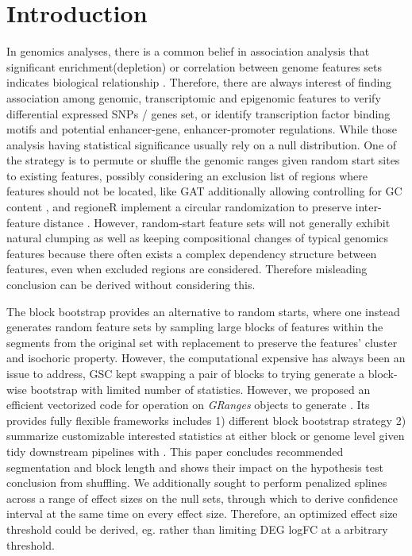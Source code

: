 \section{Introduction}
In genomics analyses, there is a common belief in association 
analysis that significant enrichment(depletion) or correlation between genome features sets indicates biological relationship \citep{reviewdilemma2014}. 
Therefore, there are always interest of finding association among genomic, transcriptomic and epigenomic features
to verify differential expressed SNPs / genes set, or identify transcription factor binding motifs and potential enhancer-gene,
enhancer-promoter regulations. 
While those analysis having statistical significance usually rely on a null distribution.
One of the strategy is to permute or shuffle the genomic ranges given random start sites to existing features, possibly considering an exclusion list of regions where features should not be located, like GAT additionally allowing controlling for GC content \citep{GAT_2013}, and regioneR implement a circular randomization to preserve inter-feature distance \citep{gel2016regioner}.
However, random-start feature sets will not generally exhibit natural clumping as well as keeping compositional changes of typical genomics features because there often exists a complex dependency structure between features, 
even when excluded regions are considered.
Therefore misleading conclusion can be derived without considering this. 

The block bootstrap \citep{politis1999subsampling}
provides an alternative to random starts, where one instead generates random feature sets by sampling large blocks of features within the segments from the original set with replacement to preserve the features' cluster and isochoric property. However, the computational expensive has always been an issue to address, GSC \citep{bickel2010subsampling} kept swapping a pair of blocks to trying generate a block-wise bootstrap with limited number of statistics.
However, we proposed an efficient vectorized code for operation on \emph{GRanges}\xspace \citep{lawrence2013software} objects to generate \bootranges. Its provides fully flexible frameworks includes 1) different block bootstrap strategy 2) summarize customizable interested statistics at either block or genome level given tidy downstream pipelines with \plyranges \citep{lee2019plyranges}. This paper concludes recommended segmentation and block length and shows their impact on the hypothesis test conclusion from shuffling.  
We additionally sought to perform penalized splines across a range of effect sizes on the null sets, through which to derive confidence interval at the same time on every effect size. Therefore, an optimized effect size threshold could be derived, eg. rather than limiting DEG logFC at a arbitrary threshold.

